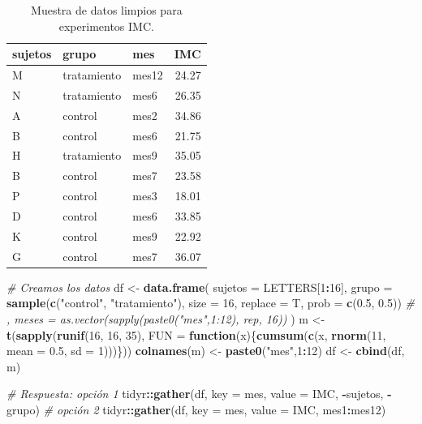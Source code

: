 \documentclass[]{article}
\newenvironment{Shaded}{\begin{snugshade}}{\end{snugshade}}
\newcommand{\KeywordTok}[1]{\textcolor[rgb]{0.13,0.29,0.53}{\textbf{#1}}}
\newcommand{\DataTypeTok}[1]{\textcolor[rgb]{0.13,0.29,0.53}{#1}}
\newcommand{\DecValTok}[1]{\textcolor[rgb]{0.00,0.00,0.81}{#1}}
\newcommand{\FloatTok}[1]{\textcolor[rgb]{0.00,0.00,0.81}{#1}}
\newcommand{\StringTok}[1]{\textcolor[rgb]{0.31,0.60,0.02}{#1}}
\newcommand{\CommentTok}[1]{\textcolor[rgb]{0.56,0.35,0.01}{\textit{#1}}}
\newcommand{\ControlFlowTok}[1]{\textcolor[rgb]{0.13,0.29,0.53}{\textbf{#1}}}
\newcommand{\OperatorTok}[1]{\textcolor[rgb]{0.81,0.36,0.00}{\textbf{#1}}}
\newcommand{\NormalTok}[1]{#1}
\begin{document}
\begin{table}[H]
\centering
\begin{tabular}{lllr}
  \hline
sujetos & grupo & mes & IMC \\ 
  \hline
M & tratamiento & mes12 & 24.27 \\ 
  N & tratamiento & mes6 & 26.35 \\ 
  A & control & mes2 & 34.86 \\ 
  B & control & mes6 & 21.75 \\ 
  H & tratamiento & mes9 & 35.05 \\ 
  B & control & mes7 & 23.58 \\ 
  P & control & mes3 & 18.01 \\ 
  D & control & mes6 & 33.85 \\ 
  K & control & mes9 & 22.92 \\ 
  G & control & mes7 & 36.07 \\ 
   \hline
\end{tabular}
\caption{Muestra de datos limpios para experimentos IMC.} 
\label{tab:sujetostidy}
\end{table}

\begin{Shaded}
\begin{Highlighting}[]
\CommentTok{# Creamos los datos}
\NormalTok{df <-}\StringTok{ }\KeywordTok{data.frame}\NormalTok{(}
  \DataTypeTok{sujetos =}\NormalTok{ LETTERS[}\DecValTok{1}\OperatorTok{:}\DecValTok{16}\NormalTok{],}
  \DataTypeTok{grupo =} \KeywordTok{sample}\NormalTok{(}\KeywordTok{c}\NormalTok{(}\StringTok{"control"}\NormalTok{, }\StringTok{"tratamiento"}\NormalTok{), }\DataTypeTok{size =} \DecValTok{16}\NormalTok{, }\DataTypeTok{replace =}\NormalTok{ T, }\DataTypeTok{prob =} \KeywordTok{c}\NormalTok{(}\FloatTok{0.5}\NormalTok{, }\FloatTok{0.5}\NormalTok{))}
  \CommentTok{# ,  meses = as.vector(sapply(paste0("mes",1:12), rep, 16))}
\NormalTok{  )}
\NormalTok{m <-}\StringTok{ }\KeywordTok{t}\NormalTok{(}\KeywordTok{sapply}\NormalTok{(}\KeywordTok{runif}\NormalTok{(}\DecValTok{16}\NormalTok{, }\DecValTok{16}\NormalTok{, }\DecValTok{35}\NormalTok{), }\DataTypeTok{FUN =} \ControlFlowTok{function}\NormalTok{(x)\{}\KeywordTok{cumsum}\NormalTok{(}\KeywordTok{c}\NormalTok{(x, }\KeywordTok{rnorm}\NormalTok{(}\DecValTok{11}\NormalTok{, }\DataTypeTok{mean =} \FloatTok{0.5}\NormalTok{, }\DataTypeTok{sd =} \DecValTok{1}\NormalTok{)))\}))}
\KeywordTok{colnames}\NormalTok{(m) <-}\StringTok{ }\KeywordTok{paste0}\NormalTok{(}\StringTok{"mes"}\NormalTok{,}\DecValTok{1}\OperatorTok{:}\DecValTok{12}\NormalTok{)}
\NormalTok{df <-}\StringTok{ }\KeywordTok{cbind}\NormalTok{(df, m)}

\CommentTok{# Respuesta: opción 1}
\NormalTok{tidyr}\OperatorTok{::}\KeywordTok{gather}\NormalTok{(df, }\DataTypeTok{key =}\NormalTok{ mes, }\DataTypeTok{value =}\NormalTok{ IMC, }\OperatorTok{-}\NormalTok{sujetos, }\OperatorTok{-}\NormalTok{grupo)}
\CommentTok{# opción 2}
\NormalTok{tidyr}\OperatorTok{::}\KeywordTok{gather}\NormalTok{(df, }\DataTypeTok{key =}\NormalTok{ mes, }\DataTypeTok{value =}\NormalTok{ IMC, mes1}\OperatorTok{:}\NormalTok{mes12)}
\end{Highlighting}
\end{Shaded}
\end{document}
